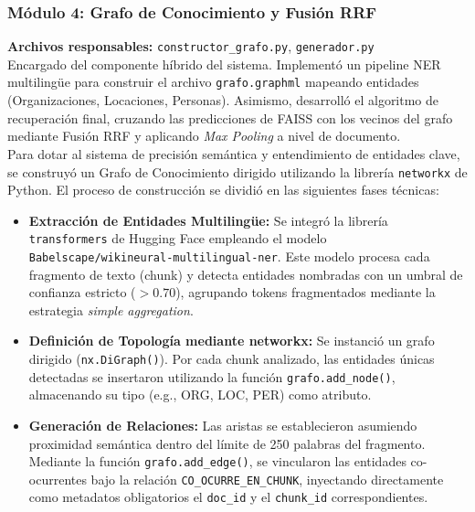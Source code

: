 \documentclass[12pt,a4paper]{article}
\begin{document}
\subsubsection{Módulo 4: Grafo de Conocimiento y Fusión RRF}
\textbf{Archivos responsables:} \texttt{constructor\_grafo.py}, \texttt{generador.py}\\
Encargado del componente híbrido del sistema. Implementó un pipeline NER multilingüe para construir el archivo \texttt{grafo.graphml} mapeando entidades (Organizaciones, Locaciones, Personas). Asimismo, desarrolló el algoritmo de recuperación final, cruzando las predicciones de FAISS con los vecinos del grafo mediante Fusión RRF y aplicando \textit{Max Pooling} a nivel de documento.\\

Para dotar al sistema de precisión semántica y entendimiento de entidades clave, se construyó un Grafo de Conocimiento dirigido utilizando la librería \texttt{networkx} de Python. El proceso de construcción se dividió en las siguientes fases técnicas:

\begin{itemize}
    \item \textbf{Extracción de Entidades Multilingüe:} Se integró la librería \texttt{transformers} de Hugging Face empleando el modelo \texttt{Babelscape/wikineural-multilingual-ner}. Este modelo procesa cada fragmento de texto (chunk) y detecta entidades nombradas con un umbral de confianza estricto ($> 0.70$), agrupando tokens fragmentados mediante la estrategia \textit{simple aggregation}.
    \item \textbf{Definición de Topología mediante networkx:} Se instanció un grafo dirigido (\texttt{nx.DiGraph()}). Por cada chunk analizado, las entidades únicas detectadas se insertaron utilizando la función \texttt{grafo.add\_node()}, almacenando su tipo (e.g., ORG, LOC, PER) como atributo.
    \item \textbf{Generación de Relaciones:} Las aristas se establecieron asumiendo proximidad semántica dentro del límite de 250 palabras del fragmento. Mediante la función \texttt{grafo.add\_edge()}, se vincularon las entidades co-ocurrentes bajo la relación \texttt{CO\_OCURRE\_EN\_CHUNK}, inyectando directamente como metadatos obligatorios el \texttt{doc\_id} y el \texttt{chunk\_id} correspondientes.
\end{itemize}
\end{document}
